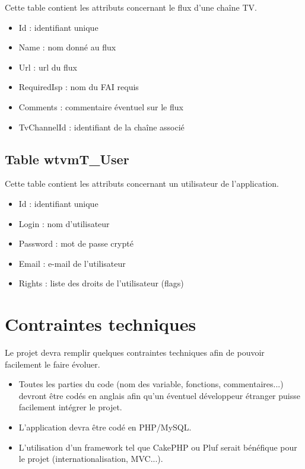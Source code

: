 \documentclass[10pt,a4paper]{article}
\begin{document}
Cette table contient les attributs concernant le flux d'une chaîne TV.

\begin{itemize}
\item Id : identifiant unique
\item Name : nom donné au flux
\item Url : url du flux
\item RequiredIsp : nom du FAI requis
\item Comments : commentaire éventuel sur le flux
\item TvChannelId : identifiant de la chaîne associé
\end{itemize}

\subsection{Table wtvmT\_User}

Cette table contient les attributs concernant un utilisateur de l'application.

\begin{itemize}
\item Id : identifiant unique
\item Login : nom d'utilisateur
\item Password : mot de passe crypté
\item Email : e-mail de l'utilisateur
\item Rights : liste des droits de l'utilisateur (flags)
\end{itemize}

\section{Contraintes techniques}

Le projet devra remplir quelques contraintes techniques afin de pouvoir facilement le faire évoluer.

\begin{itemize}
\item Toutes les parties du code (nom des variable, fonctions, commentaires...) devront être codés en anglais afin qu'un éventuel développeur étranger puisse facilement intégrer le projet.
\item L'application devra être codé en PHP/MySQL.
\item L'utilisation d'un framework tel que CakePHP ou Pluf serait bénéfique pour le projet (internationalisation, MVC...).
\end{itemize}
\end{document}
